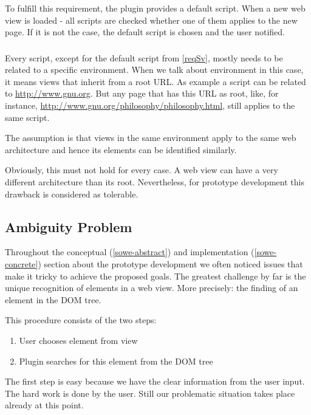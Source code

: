 To fulfill this requirement, the plugin provides a default script. When a new web view is loaded - all scripts are checked whether one of them applies to the new page. If it is not the case, the default script is chosen and the user notified. 

\subsubsection[Relation to URL set]{\reqSvi}

Every script, except for the default script from \ref{reqSv}, mostly needs to be related to a specific environment. When we talk about environment in this case, it means views that inherit from a root URL. As example a script can be related to \url{http://www.gnu.org}. But any page that has this URL as root, like, for instance, \url{http://www.gnu.org/philosophy/philosophy.html}, still applies to the same script. 

The assumption is that views in the same environment apply to the same web architecture and hence its elements can be identified similarly. 

Obviously, this must not hold for every case. A web view can have a very different architecture than its root. Nevertheless, for prototype development this drawback is considered as tolerable. 

\newpage
\subsection{Ambiguity Problem}\label{ambiguity-problem}

Throughout the conceptual (\ref{sowe-abstract}) and implementation (\ref{sowe-concrete}) section about the prototype development we often noticed issues that make it tricky to achieve the proposed goals. The greatest challenge by far is the unique recognition of elements in a web view. More precisely: the finding of an element in the DOM tree. 

This procedure consists of the two steps:
\begin{enumerate}
	\item User chooses element from view
	\item Plugin searches for this element from the DOM tree
\end{enumerate}

The first step is easy because we have the clear information from the user input. The hard work is done by the user. Still our problematic situation takes place already at this point. 

